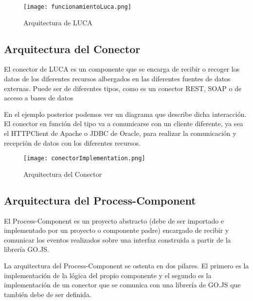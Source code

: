 \begin{figure}[!tb]
	\centering
	\texttt{[image: funcionamientoLuca.png]}
	\caption{Arquitectura de LUCA}
    \label{fig:funcionamientoLuca}
\end{figure}



\subsection{Arquitectura del Conector}


El conector de LUCA es un componente que se encarga de recibir o recoger los datos de los diferentes recursos albergados en las diferentes fuentes de datos externas. Puede ser de diferentes tipos, como es un conector REST, SOAP o de acceso a bases de datos

En el ejemplo posterior podemos ver un diagrama que describe dicha interacción. El conector en función del tipo va a comunicarse con un cliente diferente, ya sea el HTTPClient \cite{httpclient} de Apache o JDBC \cite{jdbc} de Oracle, para realizar la comunicación y recepción de datos con los diferentes recursos.

\begin{figure}[!tb]
	\centering
	\texttt{[image: conectorImplementation.png]}
	\caption{Arquitectura del Conector}\label{fig:conectorImplementation}
\end{figure}


\subsection{Arquitectura del Process-Component}

El Process-Component es un proyecto abstracto (debe de ser importado e implementado por un proyecto o componente padre) encargado de recibir y comunicar los eventos realizados sobre una interfaz construida a partir de la librería GO.JS.

La arquitectura del Process-Component se ostenta en dos pilares. El primero es la implementación de la lógica del propio componente y el segundo es la implementación de un conector que se comunica con una librería de GO.JS que también debe de ser definida.

